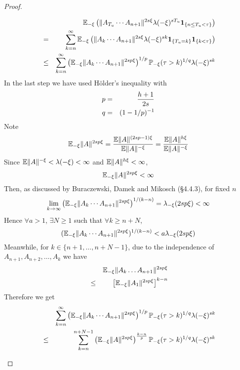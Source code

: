 \documentclass{article}
\theoremstyle{remark}
\begin{document}
\begin{proof}
\begin{enumerate}
    \begin{eqnarray*}
      && \mathbb{E}_{-\xi}\left(\|A_{T_u} \cdots A_{n+1}\|^{2s\xi}
        \lambda(-\xi)^{s T_u}
        \mathbf{1}_{\{n \leq T_u < \tau\}}\right) \\
      &=& \sum_{k=n}^\infty \mathbb{E}_{-\xi} \left(
        \|A_k \cdots A_{n+1}\|^{2s\xi}
        \lambda(-\xi)^{s k}
        \mathbf{1}_{\{T_u = k\}} \mathbf{1}_{\{k < \tau\}}\right)  \\
      &\leq& \sum_{k=n}^\infty
      \left(\mathbb{E}_{-\xi}
        \|A_k \cdots A_{n+1}\|^{2sp\xi}
      \right)^{1/p}
      \mathbb{P}_{-\xi}(\tau > k)^{1/q}
      \lambda(-\xi)^{sk}
    \end{eqnarray*}
    In the last step we have used H\"older's inequality with
    \begin{eqnarray*}
      p &=& {h + 1 \over 2s} \\
      q &=& (1 - 1/p)^{-1}
    \end{eqnarray*}
    Note
    \[
    \mathbb{E}_{-\xi} \|A\|^{2sp\xi} = {
      \mathbb{E} \|A\|^{(2sp-1)\xi}
      \over
      \mathbb{E} \|A\|^{-\xi}
    } = {
      \mathbb{E} \|A\|^{h\xi}
      \over
      \mathbb{E} \|A\|^{-\xi}
    }
    \]
    Since $\mathbb{E} \|A\|^{-\xi} < \lambda(-\xi) < \infty$ and
    $\mathbb{E} \|A\|^{h\xi} < \infty$,
    \[
    \mathbb{E}_{-\xi} \|A\|^{2sp\xi} < \infty    
    \]
    Then, as discussed by Buraczewski, Damek and Mikosch
    \cite{BuraczewskiDamekMikosch2015} (\S 4.4.3), for fixed $n$
    \[
    \lim_{k \to \infty}
    \left( \mathbb{E}_{-\xi}
      \|A_k \cdots A_{n+1}\|^{2sp\xi}
    \right)^{1/(k-n)} = \lambda_{-\xi}(2sp\xi) < \infty
    \]
    Hence $\forall a > 1$, $\exists N \geq 1$ such that $\forall k
    \geq n + N$,
    \[
    (\mathbb{E}_{-\xi}\|A_{k} \cdots A_{n+1}\|^{2sp\xi})^{1/(k-n)} <
    a \lambda_{-\xi}(2sp\xi)
    \]
    Meanwhile, for $k \in \{n+1, \dots, n+N-1\}$, due to the
    independence of $A_{n+1}, A_{n+2}, \dots, A_k$ we have
    \begin{eqnarray*}
      && \mathbb{E}_{-\xi} \|A_k \dots A_{n+1}\|^{2sp\xi} \\
      &\leq& \left[\mathbb{E}_{-\xi} \|A_1\|^{2sp\xi}\right]^{k-n}
    \end{eqnarray*}
    Therefore we get
    \begin{eqnarray*}
      && \sum_{k=n}^\infty
      \left(\E_{-\xi}
        \|A_k \cdots A_{n+1}\|^{2sp\xi}
      \right)^{1/p}
      \P_{-\xi}(\tau > k)^{1/q}
      \lambda(-\xi)^{sk} \\
      &\leq& \sum_{k=n}^{n+N-1} \left(
        \E_{-\xi} \|A\|^{2sp\xi}
      \right)^{k-n \over p} \P_{-\xi}(\tau > k)^{1/q}
      \lambda(-\xi)^{sk} \\

\end{eqnarray*}
\end{enumerate}
\end{proof}
\end{document}
